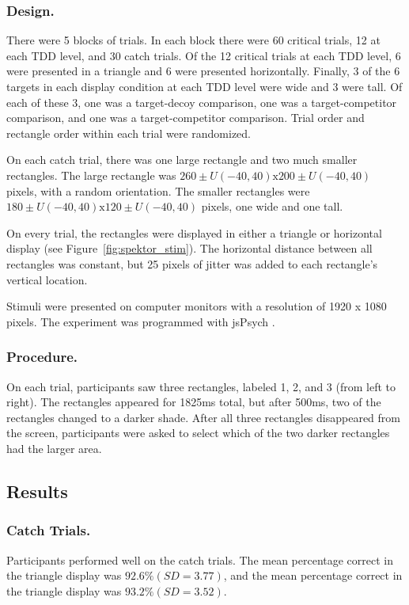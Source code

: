 \subsubsection{Design.}
There were 5 blocks of trials. In each block there were 60 critical trials, 12 at each TDD level, and 30 catch trials. Of the 12 critical trials at each TDD level, 6 were presented in a triangle and 6 were presented horizontally. Finally, 3 of the 6 targets in each display condition at each TDD level were wide and 3 were tall. Of each of these 3, one was a target-decoy comparison, one was a target-competitor comparison, and one was a target-competitor comparison. Trial order and rectangle order within each trial were randomized.

On each catch trial, there was one large rectangle and two much smaller rectangles. The large rectangle was $260 \pm U(-40, 40) \text{x} 200 \pm U(-40, 40)$ pixels, with a random orientation. The smaller rectangles were $180 \pm U(-40, 40) \text{x} 120 \pm U(-40, 40)$ pixels, one wide and one tall.

On every trial, the rectangles were displayed in either a triangle or horizontal display (see Figure~\ref{fig:spektor_stim}). The horizontal distance between all rectangles was constant, but 25 pixels of jitter was added to each rectangle's vertical location.

Stimuli were presented on computer monitors with a resolution of 1920 x 1080 pixels. The experiment was programmed with jsPsych \parencite{deleeuwJsPsychJavaScriptLibrary2015}. 

\subsubsection{Procedure.}
On each trial, participants saw three rectangles, labeled 1, 2, and 3 (from left to right). The rectangles appeared for 1825ms total, but after 500ms, two of the rectangles changed to a darker shade. After all three rectangles disappeared from the screen, participants were asked to select which of the two darker rectangles had the larger area.

\subsection{Results}

\subsubsection{Catch Trials.}
Participants performed well on the catch trials. The mean percentage correct in the triangle display was $92.6\% (SD=3.77)$, and the mean percentage correct in the triangle display was $93.2\% (SD=3.52)$. 

